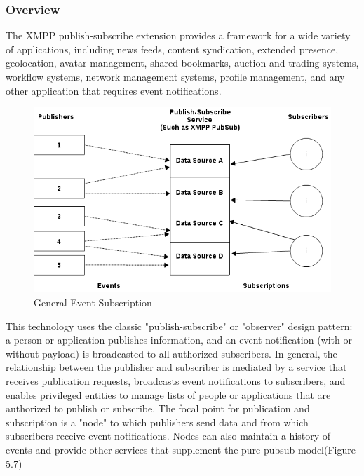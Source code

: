 \subsubsection{Overview}
The XMPP publish-subscribe extension provides a framework for a wide variety of applications, including news feeds, content syndication, extended presence, geolocation, avatar management, shared bookmarks, auction and trading systems, workflow systems, network management systems, profile management, and any other application that requires event notifications.
\begin{figure}[!ht]
    \centering
    \includegraphics[scale=0.5]{images/XEP0049.png}   
    \caption[General Event Subscription]{General Event Subscription}                      
    \end{figure}

This technology uses the classic "publish-subscribe" or "observer" design pattern: a person or application publishes information, and an event notification (with or without payload) is broadcasted to all authorized subscribers. In general, the relationship between the publisher and subscriber is mediated by a service that receives publication requests, broadcasts event notifications to subscribers, and enables privileged entities to manage lists of people or applications that are authorized to publish or subscribe. The focal point for publication and subscription is a "node" to which publishers send data and from which subscribers receive event notifications. Nodes can also maintain a history of events and provide other services that supplement the pure pubsub model(Figure 5.7)


